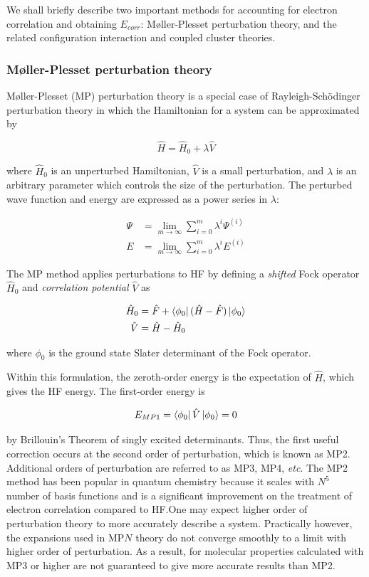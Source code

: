 We shall briefly describe two important methods for accounting for electron
correlation and obtaining $E_{corr}$: M{\o}ller-Plesset perturbation theory,
and the related configuration interaction and coupled cluster theories.

\subsubsection{M{\o}ller-Plesset perturbation theory}

M{\o}ller-Plesset (MP) perturbation theory is a special case of
Rayleigh-Sch{\"o}dinger perturbation theory in which the Hamiltonian for a
system can be approximated by

\begin{equation}
  \hat{H} = \hat{H}_0 + \lambda\hat{V}
\end{equation}

\noindent where $\hat{H}_0$ is an unperturbed Hamiltonian, $\hat{V}$ is a small
perturbation, and $\lambda$ is an arbitrary parameter which controls the size
of the perturbation. The perturbed wave function and energy are expressed as a
power series in $\lambda$:

\begin{align}
 \Psi &= \lim_{m\to\infty} \sum_{i=0}^{m} \lambda^i \Psi^{(i)} \\
  E &= \lim_{m\to\infty} \sum_{i=0}^{m} \lambda^i E^{(i)}
\end{align}

The MP method applies perturbations to HF by defining a \emph{shifted} Fock
operator $\hat{H}_0$ and \emph{correlation potential} $\hat{V}$ as

\begin{align}
  \hat{H}_0 &= \hat{F} + \bra{\phi_0}(\hat{H}-\hat{F})\ket{\phi_0} \\
  \hat{V}   &= \hat{H} - \hat{H}_0
\end{align}

\noindent where $\phi_0$ is the ground state Slater determinant of the Fock
operator.

Within this formulation, the zeroth-order energy is the expectation of
$\hat{H}$, which gives the HF energy. The first-order energy is

\begin{equation}
  E_{MP1} = \bra{\phi_0}\hat{V}\ket{\phi_0} = 0
\end{equation}

\noindent by Brillouin's Theorem of singly excited determinants. Thus, the
first useful correction occurs at the second order of perturbation, which is
known as MP2. Additional orders of perturbation are referred to as MP3, MP4,
\emph{etc}. The MP2 method has been popular in quantum chemistry because it
scales with $N^5$ number of basis functions and is a significant improvement on
the treatment of electron correlation compared to HF.\@ One may expect higher
order of perturbation theory to more accurately describe a system. Practically
however, the expansions used in MP$N$ theory do not converge smoothly to a
limit with higher order of perturbation.\cite{Leininger2000} As a result, for
molecular properties calculated with MP3 or higher are not guaranteed to give
more accurate results than MP2.

